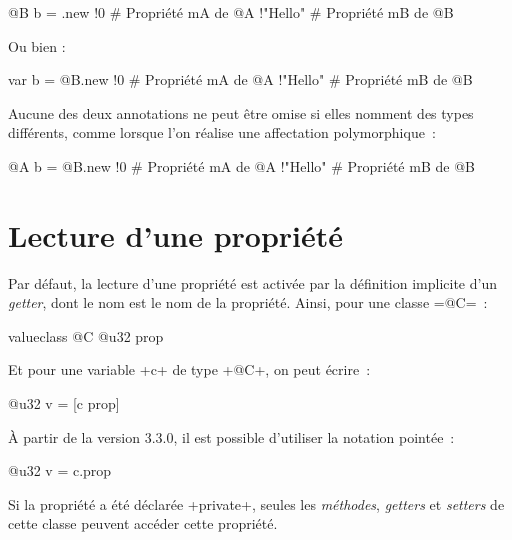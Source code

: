 \begin{galgas4}
@B b = .new {
  !0 # Propriété mA de @A
  !"Hello" # Propriété mB de @B
}
\end{galgas4}

Ou bien :
\begin{galgas4}
var b = @B.new {
  !0 # Propriété mA de @A
  !"Hello" # Propriété mB de @B
}
\end{galgas4}

Aucune des deux annotations ne peut être omise si elles nomment des types différents, comme lorsque l'on réalise une affectation polymorphique~:

\begin{galgas4}
@A b = @B.new {
  !0 # Propriété mA de @A
  !"Hello" # Propriété mB de @B
}
\end{galgas4}













\section{Lecture d'une propriété}

Par défaut, la lecture d'une propriété est activée par la définition implicite d'un \emph{getter}, dont le nom est le nom de la propriété. Ainsi, pour une classe \ggsq=@C=~:

\begin{galgas4}
valueclass @C {
  @u32 prop
}
\end{galgas4}

Et pour une variable \ggsq+c+ de type \ggsq+@C+, on peut écrire~:

\begin{galgas4}
@u32 v = [c prop]
\end{galgas4}

À partir de la version 3.3.0, il est possible d'utiliser la notation pointée~:
\begin{galgas4}
@u32 v = c.prop
\end{galgas4}

Si la propriété a été déclarée \ggsq+private+, seules les \emph{méthodes}, \emph{getters} et \emph{setters} de cette classe peuvent accéder cette propriété.








